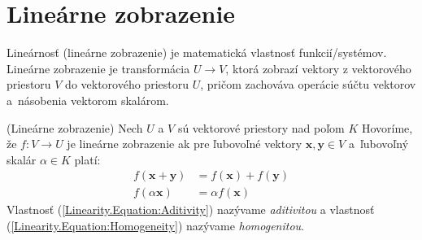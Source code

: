 \documentclass[a4paper, 10pt, ]{article}
\begin{document}
\normalsize
\normalfont




\section{Lineárne zobrazenie}
\label{Linearity}

Lineárnosť (lineárne zobrazenie) je matematická vlastnosť funkcií/systémov. Lineárne zobrazenie je transformácia $U \rightarrow V$, ktorá zobrazí vektory z vektorového priestoru $V$ do vektorového priestoru $U$, pričom zachováva operácie súčtu vektorov a~násobenia vektorom skalárom.

\begin{definition}(Lineárne zobrazenie)
    Nech $U$ a $V$ sú vektorové priestory nad poľom $K$ Hovoríme, že $f: V \rightarrow U$ je lineárne zobrazenie ak pre ľubovoľné vektory $\bm{x}, \bm{y} \in V$ a~ľubovoľný skalár $\alpha \in K$ platí:
    \begin{subequations}
        \begin{align}
            \label{Linearity.Equation:Aditivity}
            f(\bm{x} + \bm{y}) &= f(\bm{x}) + f(\bm{y}) \\[6pt]
            \label{Linearity.Equation:Homogeneity}
            f(\alpha \bm{x})   &= \alpha f(\bm{x})
        \end{align}
    \end{subequations}
    Vlastnosť (\ref{Linearity.Equation:Aditivity}) nazývame \textit{aditivitou} a vlastnosť (\ref{Linearity.Equation:Homogeneity}) nazývame \textit{homogenitou}.
\end{definition}
\end{document}
